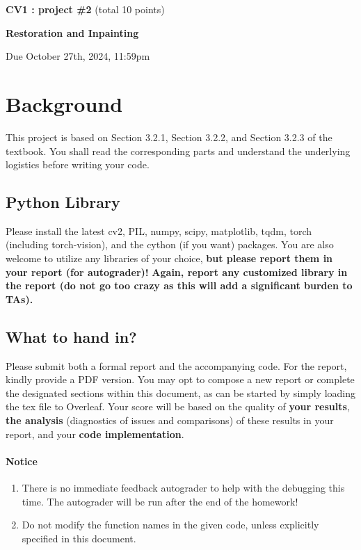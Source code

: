 \documentclass[11pt]{article}
\begin{document}
{\centering \textbf{CV1 : project \#2 } (total 10 points)

\par}{\centering \textbf{Restoration and Inpainting} \par}
{\centering Due October 27th, 2024, 11:59pm

\par}   

\section{Background} 

This project is based on Section 3.2.1, Section 3.2.2, and Section 3.2.3 of the textbook. You shall read the corresponding parts and understand the underlying logistics before writing your code.

\subsection{Python Library}
Please install the latest cv2, PIL, numpy, scipy, matplotlib, tqdm, torch (including torch-vision), and the cython (if you want) packages. You are also welcome to utilize any libraries of your choice, \textbf{but please report them in your report (for autograder)!}
\color{red}
\textbf{Again, report any customized library in the report (do not go too crazy as this will add a significant burden to TAs).}
\color{black}



\subsection{What to hand in?}

Please submit both a formal report and the accompanying code. For the report, kindly provide a PDF version. You may opt to compose a new report or complete the designated sections within this document, as can be started by simply loading the tex file to Overleaf. Your score will be based on the quality of \textbf{your results}, \textbf{the analysis} (diagnostics of issues and comparisons) of these results in your report, and your \textbf{code implementation}.

\paragraph{Notice}

\begin{enumerate}
    \item There is no immediate feedback autograder to help with the debugging this time. The autograder will be run after the end of the homework!
    \item Do not modify the function names in the given code, unless explicitly specified in this document.
\end{enumerate}
\end{document}
